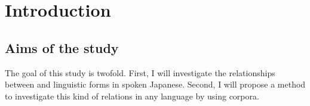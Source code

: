 \chapter{Introduction}\label{Introduction}







\section{Aims of the study}\label{IntroAims}
\largerpage
The goal of this study is twofold.
First,
I will investigate the relationships between  and linguistic forms in spoken Japanese.
Second,
I will propose a method to investigate
this kind of relations in any language by using corpora. %

